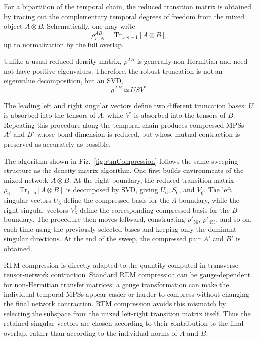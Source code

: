 \documentclass[12pt]{article}
\begin{document}
For a bipartition of the temporal chain, the reduced transition matrix is obtained by tracing out the complementary temporal degrees of freedom from the mixed object \(A\otimes B\).
Schematically, one may write
\begin{equation}
    \rho^{AB}_{i\cdots N}=\mathrm{Tr}_{1\cdots i-1}[A\otimes B]
\end{equation}
up to normalization by the full overlap.

Unlike a usual reduced density matrix, \(\rho^{AB}\) is generally non-Hermitian and need not have positive eigenvalues.
Therefore, the robust truncation is not an eigenvalue decomposition, but an SVD,
\begin{equation}
    \rho^{AB} \simeq U S V^\dagger 
\end{equation}

The leading left and right singular vectors define two different truncation bases: \(U\) is absorbed into the tensors of \(A\), while \(V^\dagger\) is absorbed into the tensors of \(B\). 
Repeating this procedure along the temporal chain produces compressed MPSs \(A'\) and \(B'\) whose bond dimension is reduced, but whose mutual contraction is preserved as accurately as possible.

The algorithm shown in Fig.~\ref{fig:rtmCompression} follows the same sweeping structure as the density-matrix algorithm. 
One first builds environments of the mixed network \(A\otimes B\).
At the right boundary, the reduced transition matrix \(\rho_6=\mathrm{Tr}_{1\cdots5}[A\otimes B]\) is decomposed by SVD, giving \(U_6\), \(S_6\), and \(V_6^\dagger\).
The left singular vectors \(U_6\) define the compressed basis for the \(A\) boundary, while the right singular vectors \(V_6^\dagger\) define the corresponding compressed basis for the \(B\) boundary.
The procedure then moves leftward, constructing \(\rho'_{56}\), \(\rho'_{456}\), and so on, each time using the previously selected bases and keeping only the dominant singular directions.
At the end of the sweep, the compressed pair \(A'\) and \(B'\) is obtained.

RTM compression \cite{Carignano2024TemporalEntropy, carignanoITransversejlLibraryTransverse2025, carignanoOvercomingEntanglementBarrier2025} is directly adapted to the quantity computed in transverse tensor-network contraction. 
Standard RDM compression can be gauge-dependent for non-Hermitian transfer matrices: a gauge transformation can make the individual temporal MPSs appear easier or harder to compress without changing the final network contraction.
RTM compression avoids this mismatch by selecting the subspace from the mixed left-right transition matrix itself. 
Thus the retained singular vectors are chosen according to their contribution to the final overlap, rather than according to the individual norms of \(A\) and \(B\).
\end{document}
